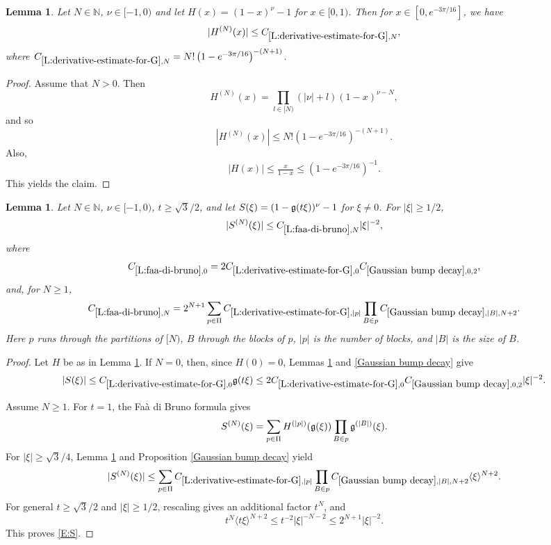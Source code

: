 \documentclass[12pt,reqno]{amsart}
\theoremstyle{plain}
\newtheorem{lemma}[theorem]{Lemma}
\numberwithin{equation}{section}
\theoremstyle{remark}
\newcommand{\using}[1]{}
\newcommand{\N}{{\mathbb N}}
\begin{document}
\begin{lemma}\label{L:derivative-estimate-for-G}
Let $N\in \N$, $\nu\in [-1,0)$ and let $H(x)=(1-x)^{\nu}-1$ for $x\in [0,1)$. Then for $x\in [0,e^{-3\pi/16}]$, we have
\begin{equation}\label{auto:exponential-composition-derivative-bound}
|H^{(N)}(x)| \leq C_{\ref{L:derivative-estimate-for-G},N},
\end{equation}
where $C_{\ref{L:derivative-estimate-for-G},N}= N! \left(1 - e^{-3\pi/16}\right)^{-(N+1)}$.
\end{lemma}

\begin{proof}
Assume that $N >0$. Then
\[
H^{(N)}(x)=\prod_{l\in [N)} (|\nu|+l)(1-x)^{\nu-N},
\]
and so
\[
|H^{(N)}(x)| \leq N! \left(1 - e^{-3\pi/16}\right)^{-(N+1)}.
\]
Also,
\[
|H(x)| \leq \tfrac{x}{1-x} \leq \left(1 - e^{-3\pi/16}\right)^{-1}.
\]
This yields the claim.
\end{proof}


\begin{lemma}\label{L:faa-di-bruno}\using{L:derivative-estimate-for-G}\using{Gaussian bump decay}
Let $N\in\N$, $\nu\in[-1,0)$, $t\ge\sqrt3/2$, and let $S(\xi)=(1-\mathfrak{g}(t\xi))^\nu-1$ for $\xi\ne0$. For $|\xi|\ge1/2$,
\begin{equation}\label{E:S}
|S^{(N)}(\xi)|\le C_{\ref{L:faa-di-bruno},N}|\xi|^{-2},
\end{equation}
where
\begin{equation}\label{auto:Faa-di-Bruno-zero-constant}
C_{\ref{L:faa-di-bruno},0}
=2C_{\ref{L:derivative-estimate-for-G},0}C_{\ref{Gaussian bump decay},0,2},
\end{equation}
and, for $N\ge1$,
\begin{equation}\label{auto:Faa-di-Bruno-positive-constant}
C_{\ref{L:faa-di-bruno},N}
=2^{N+1}\sum_{p\in\Pi}C_{\ref{L:derivative-estimate-for-G},|p|}
\prod_{B\in p}C_{\ref{Gaussian bump decay},|B|,N+2}.
\end{equation}
Here $p$ runs through the partitions of $[N)$, $B$ through the blocks of $p$, $|p|$ is the number of blocks, and $|B|$ is the size of $B$.
\end{lemma}
\begin{proof}
Let $H$ be as in Lemma \ref{L:derivative-estimate-for-G}. If $N=0$, then, since $H(0)=0$, Lemmas \ref{L:derivative-estimate-for-G} and \ref{Gaussian bump decay} give
\[
|S(\xi)|
\le C_{\ref{L:derivative-estimate-for-G},0}\mathfrak{g}(t\xi)
\le2C_{\ref{L:derivative-estimate-for-G},0}C_{\ref{Gaussian bump decay},0,2}|\xi|^{-2}.
\]

Assume $N\ge1$. For $t=1$, the Fa\`a di Bruno formula gives
\[
S^{(N)}(\xi)
=
\sum_{p\in\Pi}H^{(|p|)}(\mathfrak{g}(\xi))
\prod_{B\in p}\mathfrak{g}^{(|B|)}(\xi).
\]
For $|\xi|\ge\sqrt3/4$, Lemma \ref{L:derivative-estimate-for-G} and Proposition \ref{Gaussian bump decay} yield
\[
|S^{(N)}(\xi)|
\le
\sum_{p\in\Pi}C_{\ref{L:derivative-estimate-for-G},|p|}
\prod_{B\in p}C_{\ref{Gaussian bump decay},|B|,N+2}
\langle\xi\rangle^{N+2}.
\]
For general $t\ge\sqrt3/2$ and $|\xi|\ge1/2$, rescaling gives an additional factor $t^N$, and
\[
t^N\langle t\xi\rangle^{N+2}
\le t^{-2}|\xi|^{-N-2}
\le2^{N+1}|\xi|^{-2}.
\]
This proves \eqref{E:S}.
\end{proof}
\end{document}
